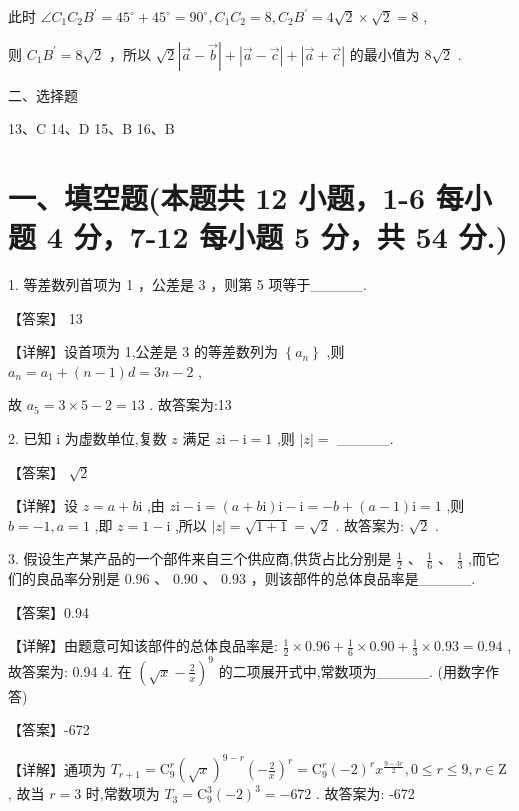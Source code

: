 \documentclass[10pt]{article}
\begin{document}
此时 \(\angle {C}_{1}{C}_{2}{B}^{\prime } = {45}^{ \circ  } + {45}^{ \circ  } = {90}^{ \circ  },{C}_{1}{C}_{2} = 8,{C}_{2}{B}^{\prime } = 4\sqrt{2} \times  \sqrt{2} = 8\) ,

则 \({C}_{1}{B}^{\prime } = 8\sqrt{2}\) ，所以 \(\sqrt{2}\left| {\overrightarrow{a} - \overrightarrow{b}}\right|  + \left| {\overrightarrow{a} - \overrightarrow{c}}\right|  + \left| {\overrightarrow{a} + \overrightarrow{c}}\right|\) 的最小值为 \(8\sqrt{2}\) .

二、选择题

13、C 14、D 15、B 16、B

\section*{一、填空题(本题共 12 小题，1-6 每小题 4 分，7-12 每小题 5 分，共 54 分.)}

1. 等差数列首项为 1 ，公差是 3 ，则第 5 项等于\_\_\_\_\_.

【答案】 13

【详解】设首项为 1,公差是 3 的等差数列为 \(\left\{  {a}_{n}\right\}\) ,则 \({a}_{n} = {a}_{1} + \left( {n - 1}\right) d = {3n} - 2\) ,

故 \({a}_{5} = 3 \times  5 - 2 = {13}\) . 故答案为:13

2. 已知 \(\mathrm{i}\) 为虚数单位,复数 \(z\) 满足 \(z\mathrm{i} - \mathrm{i} = 1\) ,则 \(\left| z\right|  =\) \_\_\_\_\_.

【答案】 \(\sqrt{2}\)

【详解】设 \(z = a + b\mathrm{i}\) ,由 \(z\mathrm{i} - \mathrm{i} = \left( {a + b\mathrm{i}}\right) \mathrm{i} - \mathrm{i} =  - b + \left( {a - 1}\right) \mathrm{i} = 1\) ,则 \(b =  - 1,a = 1\) ,即 \(z = 1 - \mathrm{i}\) ,所以 \(\left| z\right|  = \sqrt{1 + 1} = \sqrt{2}\) . 故答案为: \(\sqrt{2}\) .

3. 假设生产某产品的一个部件来自三个供应商,供货占比分别是 \(\frac{1}{2}\text{ 、 }\frac{1}{6}\text{ 、 }\frac{1}{3}\) ,而它们的良品率分别是 \({0.96}\text{ 、 }{0.90}\text{ 、 }{0.93}\) ，则该部件的总体良品率是\_\_\_\_\_.

【答案】0.94

【详解】由题意可知该部件的总体良品率是: \(\frac{1}{2} \times  {0.96} + \frac{1}{6} \times  {0.90} + \frac{1}{3} \times  {0.93} = {0.94}\) ,故答案为: 0.94 4. 在 \({\left( \sqrt{x} - \frac{2}{x}\right) }^{9}\) 的二项展开式中,常数项为\_\_\_\_\_. (用数字作答)

【答案】-672

【详解】通项为 \({T}_{r + 1} = {\mathrm{C}}_{9}^{r}{\left( \sqrt{x}\right) }^{9 - r}{\left( -\frac{2}{x}\right) }^{r} = {\mathrm{C}}_{9}^{r}{\left( -2\right) }^{r}{x}^{\frac{9 - {3r}}{2}},0 \leq  r \leq  9,r \in  \mathrm{Z}\) , 故当 \(r = 3\) 时,常数项为 \({T}_{3} = {\mathrm{C}}_{9}^{3}{\left( -2\right) }^{3} =  - {672}\) . 故答案为: -672
\end{document}
